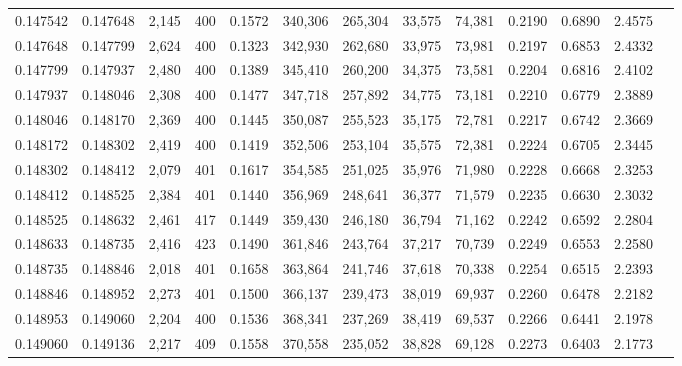 \begin{tabular}{rrrrrrrrrrrrr}
0.147542 & 0.147648 & 2,145 & 400 &                                     0.1572 & 340,306 & 265,304 &  33,575 &  74,381 & 0.2190 & 0.6890 & 2.4575 \\
0.147648 & 0.147799 & 2,624 & 400 &                                     0.1323 & 342,930 & 262,680 &  33,975 &  73,981 & 0.2197 & 0.6853 & 2.4332 \\
0.147799 & 0.147937 & 2,480 & 400 &                                     0.1389 & 345,410 & 260,200 &  34,375 &  73,581 & 0.2204 & 0.6816 & 2.4102 \\
0.147937 & 0.148046 & 2,308 & 400 &                                     0.1477 & 347,718 & 257,892 &  34,775 &  73,181 & 0.2210 & 0.6779 & 2.3889 \\
0.148046 & 0.148170 & 2,369 & 400 &                                     0.1445 & 350,087 & 255,523 &  35,175 &  72,781 & 0.2217 & 0.6742 & 2.3669 \\
0.148172 & 0.148302 & 2,419 & 400 &                                     0.1419 & 352,506 & 253,104 &  35,575 &  72,381 & 0.2224 & 0.6705 & 2.3445 \\
0.148302 & 0.148412 & 2,079 & 401 &                                     0.1617 & 354,585 & 251,025 &  35,976 &  71,980 & 0.2228 & 0.6668 & 2.3253 \\
0.148412 & 0.148525 & 2,384 & 401 &                                     0.1440 & 356,969 & 248,641 &  36,377 &  71,579 & 0.2235 & 0.6630 & 2.3032 \\
0.148525 & 0.148632 & 2,461 & 417 &                                     0.1449 & 359,430 & 246,180 &  36,794 &  71,162 & 0.2242 & 0.6592 & 2.2804 \\
0.148633 & 0.148735 & 2,416 & 423 &                                     0.1490 & 361,846 & 243,764 &  37,217 &  70,739 & 0.2249 & 0.6553 & 2.2580 \\
0.148735 & 0.148846 & 2,018 & 401 &                                     0.1658 & 363,864 & 241,746 &  37,618 &  70,338 & 0.2254 & 0.6515 & 2.2393 \\
0.148846 & 0.148952 & 2,273 & 401 &                                     0.1500 & 366,137 & 239,473 &  38,019 &  69,937 & 0.2260 & 0.6478 & 2.2182 \\
0.148953 & 0.149060 & 2,204 & 400 &                                     0.1536 & 368,341 & 237,269 &  38,419 &  69,537 & 0.2266 & 0.6441 & 2.1978 \\
0.149060 & 0.149136 & 2,217 & 409 &                                     0.1558 & 370,558 & 235,052 &  38,828 &  69,128 & 0.2273 & 0.6403 & 2.1773 \\

\end{tabular}
